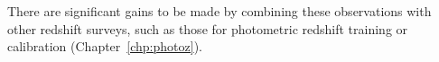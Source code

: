 There are significant gains to be made by combining these observations with
other redshift surveys, such as those for photometric redshift training
or calibration (Chapter~\ref{chp:photoz}).


%
%
%
%
